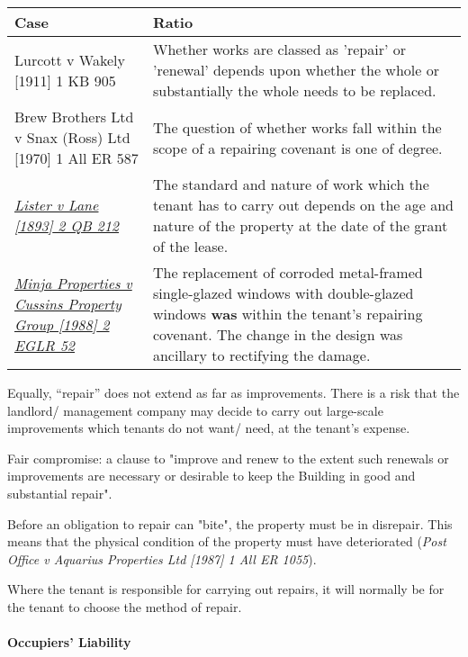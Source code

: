 \documentclass[
]{article}
\begin{document}
\begin{longtable}[]{@{}ll@{}}
\toprule()
Case & Ratio \\
\midrule()
\endhead
Lurcott v Wakely {[}1911{]} 1 KB 905 & Whether works are classed as
'repair' or 'renewal' depends upon whether the whole or substantially
the whole needs to be replaced. \\
Brew Brothers Ltd v Snax (Ross) Ltd {[}1970{]} 1 All ER 587 & The
question of whether works fall within the scope of a repairing covenant
is one of degree. \\
\emph{\href{https://uk.practicallaw.thomsonreuters.com/D-009-7108?originationContext=document\&transitionType=PLDocumentLink\&contextData=(sc.Default)\&ppcid=47d8e69b58514ba1976c981efd5911b3\&comp=pluk}{Lister
v Lane {[}1893{]} 2 QB 212}} & The standard and nature of work which the
tenant has to carry out depends on the age and nature of the property at
the date of the grant of the lease. \\
\emph{\href{https://uk.practicallaw.thomsonreuters.com/D-009-7109?originationContext=document\&transitionType=PLDocumentLink\&contextData=(sc.Default)\&ppcid=47d8e69b58514ba1976c981efd5911b3\&comp=pluk}{Minja
Properties v Cussins Property Group {[}1988{]} 2 EGLR 52}} & The
replacement of corroded metal-framed single-glazed windows with
double-glazed windows \textbf{was} within the tenant's repairing
covenant. The change in the design was ancillary to rectifying the
damage. \\
\bottomrule()
\end{longtable}

Equally, ``repair'' does not extend as far as improvements. There is a
risk that the landlord/ management company may decide to carry out
large-scale improvements which tenants do not want/ need, at the
tenant's expense.

Fair compromise: a clause to "improve and renew to the extent such
renewals or improvements are necessary or desirable to keep the Building
in good and substantial repair".

Before an obligation to repair can "bite", the property must be in
disrepair. This means that the physical condition of the property must
have deteriorated (\emph{Post Office v Aquarius Properties Ltd
{[}1987{]} 1 All ER 1055}).

Where the tenant is responsible for carrying out repairs, it will
normally be for the tenant to choose the method of repair.

\hypertarget{occupiers-liability}{%
\paragraph{Occupiers' Liability}\label{occupiers-liability}}
\end{document}
